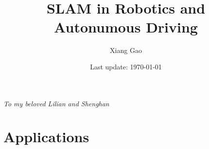\documentclass[fontsize=11pt,a4paper,openleft,pagesize=auto]{book}
\begin{document}
\title{SLAM in Robotics and Autonumous Driving}
\author{Xiang Gao}
\date{Last update: \today}

\frontmatter
\maketitle



\clearpage
\begin{center}
	\thispagestyle{empty}
	\vspace*{\fill}
	\Large \emph{To my beloved Lilian and Shenghan}
	\vspace*{\fill}
\end{center}

\tableofcontents

\thispagestyle{empty}

\thispagestyle{empty}
\mainmatter















\thispagestyle{empty}
\part{Applications}
\thispagestyle{empty}


 
\hypersetup{bookmarksdepth=2}

\appendix
{}
\hypersetup{bookmarksdepth=2}

%
%

\backmatter
\small


\newpage
\end{document}
